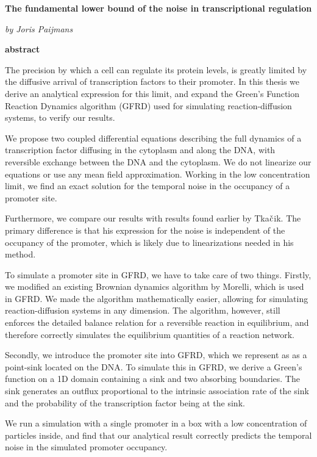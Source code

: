 \documentclass[a4paper,10pt]{article}
\begin{document}
\begin{center}
{\center \bf The fundamental lower bound of the noise in transcriptional regulation}
\end{center}

\begin{center}
{\center \it by Joris Paijmans}
\end{center}

\begin{center}
{\center \bf abstract}
\end{center}

The precision by which a cell can regulate its protein levels, is greatly limited by the diffusive arrival of transcription factors to their promoter. In this thesis we derive an analytical expression for this limit, and expand the Green's Function Reaction Dynamics algorithm (GFRD) used for simulating reaction-diffusion systems, to verify our results.

We propose two coupled differential equations describing the full dynamics of a transcription factor diffusing in the cytoplasm and along the DNA, with reversible exchange between the DNA and the cytoplasm. We do not linearize our equations or use any mean field approximation. Working in the low concentration limit, we find an exact solution for the temporal noise in the occupancy of a promoter site. 

Furthermore, we compare our results with results found earlier by Tka$\check{\rm c}$ik. The primary difference is that his expression for the noise is independent of the occupancy of the promoter, which is likely due to linearizations needed in his method.

To simulate a promoter site in GFRD, we have to take care of two things. Firstly, we modified an existing Brownian dynamics algorithm by Morelli, which is used in GFRD. We made the algorithm mathematically easier, allowing for simulating reaction-diffusion systems in any dimension. The algorithm, however, still enforces the detailed balance relation for a reversible reaction in equilibrium, and therefore correctly simulates the equilibrium quantities of a reaction network. 

Secondly, we introduce the promoter site into GFRD, which we represent as as a point-sink located on the DNA. To simulate this in GFRD, we derive a Green's function on a 1D domain containing a sink and two absorbing boundaries. The sink generates an outflux proportional to the intrinsic association rate of the sink and the probability of the transcription factor being at the sink. 

We run a simulation with a single promoter in a box with a low concentration of particles inside, and find that our analytical result correctly predicts the temporal noise in the simulated promoter occupancy.
\end{document}
